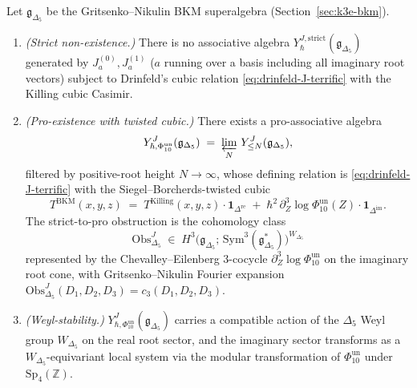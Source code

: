 \begin{theorem}
\label{thm:bkm-drinfeld-J-pro-existence}
Let $\mathfrak g_{\Delta_5}$ be the Gritsenko--Nikulin BKM superalgebra
(Section~\ref{sec:k3e-bkm}).
\begin{enumerate}[label=\textup{(\roman*)}]
\item \emph{(Strict non-existence.)} There is no associative algebra
$Y^{J,\mathrm{strict}}_\hbar(\mathfrak g_{\Delta_5})$ generated by $J^{(0)}_a,J^{(1)}_a$
($a$ running over a basis including all imaginary root vectors) subject
to Drinfeld's cubic relation \eqref{eq:drinfeld-J-terrific} with the
Killing cubic Casimir.
\item \emph{(Pro-existence with twisted cubic.)} There exists a
pro-associative algebra
\[
 Y^J_{\hbar,\Phi_{10}^{\mathrm{un}}}(\mathfrak g_{\Delta_5})
 \;=\; \varprojlim_N\, Y^J_{\le N}(\mathfrak g_{\Delta_5}),
\]
filtered by positive-root height $N\to\infty$, whose defining relation
is \eqref{eq:drinfeld-J-terrific} with the Siegel--Borcherds-twisted
cubic
\[
 T^{\mathrm{BKM}}(x,y,z)
 \;=\; T^{\mathrm{Killing}}(x,y,z)\cdot\mathbf{1}_{\Delta^{\mathrm{re}}}
 \;+\; \hbar^2\,\partial^3_Z\log\Phi_{10}^{\mathrm{un}}(Z)\cdot\mathbf{1}_{\Delta^{\mathrm{im}}}.
\]
The strict-to-pro obstruction is the cohomology class
\[
 \mathrm{Obs}^J_{\Delta_5}
 \;\in\; H^3\bigl(\mathfrak g_{\Delta_5};\,\mathrm{Sym}^3(\mathfrak g_{\Delta_5}^*)\bigr)^{W_{\Delta_5}}
\]
represented by the Chevalley--Eilenberg $3$-cocycle
$\partial^3_Z\log\Phi_{10}^{\mathrm{un}}$ on the imaginary root cone, with
Gritsenko--Nikulin Fourier expansion
$\mathrm{Obs}^J_{\Delta_5}(D_1,D_2,D_3) = c_3(D_1,D_2,D_3)$.
\item \emph{(Weyl-stability.)} $Y^J_{\hbar,\Phi_{10}^{\mathrm{un}}}(\mathfrak g_{\Delta_5})$
carries a compatible action of the $\Delta_5$ Weyl group $W_{\Delta_5}$ on
the real root sector, and the imaginary sector transforms as a
$W_{\Delta_5}$-equivariant local system via the modular transformation
of \(\Phi_{10}^{\mathrm{un}}\) under $\mathrm{Sp}_4(\mathbb Z)$.
\end{enumerate}
\end{theorem}

